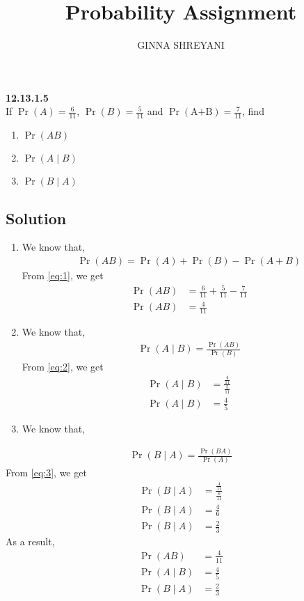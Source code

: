 \documentclass[10pt,twocolumn]{article}
\title{
Probability Assignment
}
\author{GINNA SHREYANI}
\date{}
\providecommand{\pr}[1]{\ensuremath{\Pr\left(#1\right)}}
\begin{document}
\maketitle


\textbf{12.13.1.5}\\
If $\pr A=\frac{6}{11}$, $\pr B=\frac{5}{11}$ and $\pr{\text{A+B}}=\frac{7}{11}$, find
\begin{enumerate}
	\item $\pr{AB}$   
	\item $\pr{A \mid B}$
	\item $\pr{B \mid A}$
\end{enumerate}
\subsection*{Solution}
\begin{enumerate}
	\item We know that,
\begin{align}
	\pr{AB} = \pr A + \pr B -\pr{A+B}
	\label{eq:1}
\end{align}
From \eqref{eq:1}, we get
\begin{align}
	\pr{AB} &= \frac{6}{11} + \frac{5}{11} - \frac{7}{11}\\
	\pr{AB} &= \frac{4}{11}
\end{align}
	\item We know that,
\begin{align}
	\pr{A \mid B} = \frac{\pr{AB}}{\pr B}
	\label{eq:2}
\end{align}
From \eqref{eq:2}, we get
\begin{align}
	\pr{A \mid B} &= \frac{\frac{4}{11}}{\frac{5}{11}}\\
	\pr{A \mid B} &= \frac{4}{5}
\end{align}
	\item We know that,
\end{enumerate}
\begin{align}
	\pr{B \mid A}=\frac{\pr{BA}}{\pr A}
	\label{eq:3}
\end{align}
From \eqref{eq:3}, we get
\begin{align}
	\pr{B \mid A} &= \frac{\frac{4}{11}}{\frac{6}{11}}\\
	\pr{B \mid A} &= \frac{4}{6}\\
	\pr{B \mid A} &= \frac{2}{3}
\end{align}
As a result,
\begin{align}
	\pr{AB} &= \frac{4}{11}\\
	\pr{A \mid B} &= \frac{4}{5}\\
	\pr{B \mid A} &= \frac{2}{3}
\end{align}
\end{document}
